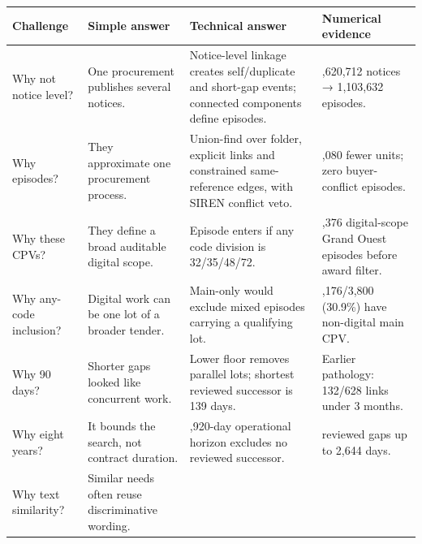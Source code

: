 {\def\LTcaptype{none} %
\begin{longtable}[]{@{}
  >{\raggedright\arraybackslash}p{}
  >{\raggedright\arraybackslash}p{}
  >{\raggedright\arraybackslash}p{}
  >{\raggedright\arraybackslash}p{}@{}}
\toprule\noalign{}
\begin{minipage}[b]{\linewidth}\raggedright
Challenge
\end{minipage} & \begin{minipage}[b]{\linewidth}\raggedright
Simple answer
\end{minipage} & \begin{minipage}[b]{\linewidth}\raggedright
Technical answer
\end{minipage} & \begin{minipage}[b]{\linewidth}\raggedright
Numerical evidence
\end{minipage} \\
\midrule\noalign{}
\endhead
\bottomrule\noalign{}
\endlastfoot
Why not notice level? & One procurement publishes several notices. &
Notice-level linkage creates self/duplicate and short-gap events;
connected components define episodes. & 1,620,712 notices → 1,103,632
episodes. \\
Why episodes? & They approximate one procurement process. & Union-find
over folder, explicit links and constrained same-reference edges, with
SIREN conflict veto. & 517,080 fewer units; zero buyer-conflict
episodes. \\
Why these CPVs? & They define a broad auditable digital scope. & Episode
enters if any code division is 32/35/48/72. & 7,376 digital-scope Grand
Ouest episodes before award filter. \\
Why any-code inclusion? & Digital work can be one lot of a broader
tender. & Main-only would exclude mixed episodes carrying a qualifying
lot. & 1,176/3,800 (30.9\%) have non-digital main CPV. \\
Why 90 days? & Shorter gaps looked like concurrent work. & Lower floor
removes parallel lots; shortest reviewed successor is 139 days. &
Earlier pathology: 132/628 links under 3 months. \\
Why eight years? & It bounds the search, not contract duration. &
2,920-day operational horizon excludes no reviewed successor. & reviewed
gaps up to 2,644 days. \\
Why text similarity? & Similar needs often reuse discriminative wording.

\end{longtable}}
